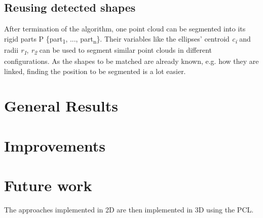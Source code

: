 \subsection{Reusing detected shapes}

After termination of the algorithm, one point cloud can be segmented into its rigid parts P \{part\textsubscript{1}, ..., part\textsubscript{n}\}. Their variables like the ellipses' centroid \textit{c\textsubscript{i}} and radii \textit{r\textsubscript{1}}, \textit{r\textsubscript{2}} can be used to segment similar point clouds in different configurations. As the shapes to be matched are already known, e.g. how they are linked, finding the position to be segmented is a lot easier.



\section{General Results}

\section{Improvements}

\section{Future work}

The approaches implemented in 2D are then implemented in 3D using the PCL. 

